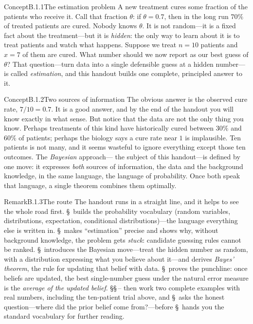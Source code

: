 \documentclass[main.tex]{subfiles}
\begin{document}
\clearpage

\begin{ObjL}{Concept}{B.1.1}{The estimation problem}
A new treatment cures some fraction of the patients who receive it. Call that fraction
$\theta$: if $\theta=0.7$, then in the long run $70\%$ of treated patients are cured. Nobody
knows $\theta$. It is not random---it is a fixed fact about the treatment---but it is
\emph{hidden}: the only way to learn about it is to treat patients and watch what happens.
Suppose we treat $n=10$ patients and $x=7$ of them are cured. What number should we now
report as our best guess of $\theta$? That question---turn data into a single defensible
guess at a hidden number---is called \emph{estimation}, and this handout builds one complete,
principled answer to it.
\end{ObjL}

\begin{ObjL}{Concept}{B.1.2}{Two sources of information}
The obvious answer is the observed cure rate, $7/10=0.7$. It is a good answer, and by the end
of the handout you will know exactly in what sense. But notice that the data are not the only
thing you know. Perhaps treatments of this kind have historically cured between $30\%$ and
$60\%$ of patients; perhaps the biology says a cure rate near $1$ is implausible. Ten
patients is not many, and it seems wasteful to ignore everything except those ten outcomes.
The \emph{Bayesian} approach--- the subject of this handout---is defined by one move: it
expresses \emph{both} sources of information, the data and the background knowledge, in the
same language, the language of probability. Once both speak that language, a single theorem
combines them optimally.
\end{ObjL}

\begin{ObjL}{Remark}{B.1.3}{The route}
The handout runs in a straight line, and it helps to see the whole road first.
\S\, builds the probability vocabulary (random variables, distributions,
expectation, conditional distributions)---the language everything else is written in.
\S\, makes ``estimation'' precise and shows why, without background knowledge, the
problem gets \emph{stuck}: candidate guessing rules cannot be ranked. \S\,
introduces the Bayesian move---treat the hidden number as random, with a distribution
expressing what you believe about it---and derives \emph{Bayes' theorem}, the rule for
updating that belief with data. \S\, proves the punchline: once beliefs are
updated, the best single-number guess under the natural error measure is the \emph{average
of the updated belief}. \S\S\,-- then work two complete examples with
real numbers, including the ten-patient trial above, and \S\, asks the honest
question---where did the prior belief come from?---before \S\, hands you the
standard vocabulary for further reading.
\end{ObjL}
\end{document}
